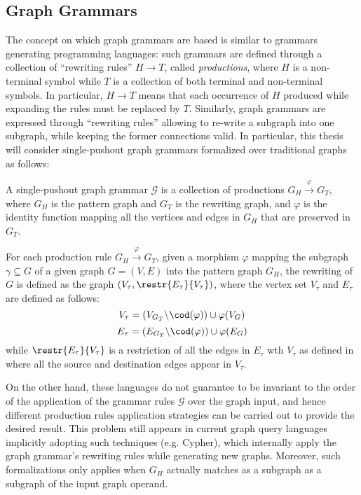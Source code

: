 \subsection{Graph Grammars}\label{subsec:ggram}
The concept on which  graph grammars are based is similar to grammars generating programming languages: such grammars are defined through a collection of ``rewriting rules'' $H\to T$, called \textit{productions}, where $H$ is a non-terminal symbol while $T$ is a collection of both terminal and non-terminal symbols. In particular, $H\to T$ means that each occurrence of $H$ produced while expanding the rules must be replaced by $T$. Similarly, graph grammars are expressed through ``rewriting rules'' allowing to re-write a subgraph into one subgraph, while keeping the former connections valid. In particular, this thesis will consider single-pushout graph grammars formalized over traditional graphs as follows:

\begin{definition}
	\label{def:graphgrammar}
  A single-pushout graph grammar $\mathcal{G}$ \cite{ModCheckWithGG,Lowe93} is a collection of productions $G_H\xrightarrow{\varphi}G_T$, where $G_H$ is the pattern graph and $G_T$ is the rewriting graph, and $\varphi$ is the identity function mapping all the vertices and edges in $G_H$ that are preserved in $G_T$.

  For each production rule $G_H\xrightarrow{\varphi}G_T$, given a morphism $\varphi$ mapping the subgraph $\gamma\subseteq G$ of a given graph $G=(V,E)$ into the pattern graph $G_H$, the rewriting of $G$ is defined as the graph $(V_\tau,\restr{E_\tau}{V_\tau})$, where the vertex set $V_\tau$ and $E_\tau$ are defined as follows:
  \[V_\tau = (V_{G_T}\backslash \cod(\varphi))\cup \varphi(V_G)\]
  \[E_\tau = (E_{G_T}\backslash \cod(\varphi))\cup \varphi(E_G)\]
  while $\restr{E_\tau}{V_\tau}$ is a restriction of all the edges in $E_\tau$ wth $V_\tau$ as defined in \cite{ModCheckWithGG} where all the source and destination edges appear in $V_\tau$.
\end{definition}

On the other hand, these languages do not guarantee to be invariant to the order of the application of the grammar rules $\mathcal{G}$ over the graph input, and hence different production rules application strategies can be carried out to provide the desired result. %
This problem still appears in current graph query languages implicitly adopting such techniques (e.g. Cypher), which internally apply the graph grammar's rewriting rules while generating new graphs. Moreover, such formalizations only applies when $G_H$ actually matches as a subgraph as a subgraph of the input graph operand.

